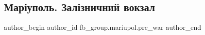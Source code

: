  
 
 
 
 

\subsection{Маріуполь. Залізничний вокзал}
\label{sec:11_02_2023.fb.fb_group.mariupol.pre_war.10.mar_upol__zal_znichn}

\ifcmt
 author_begin
   author_id fb_group.mariupol.pre_war
 author_end
\fi
